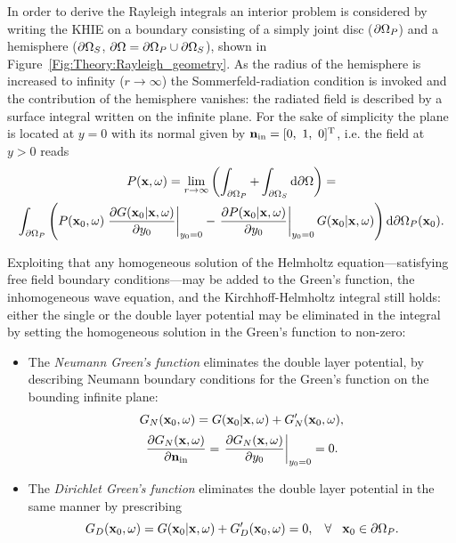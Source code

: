 

In order to derive the Rayleigh integrals an interior problem is considered by writing the KHIE on a boundary consisting of a simply joint disc ($\partial \Omega_P$) and a hemisphere ($\partial \Omega_S$, $\partial \Omega = \partial \Omega_P \cup \partial \Omega_S$), shown in Figure\ \ref{Fig:Theory:Rayleigh_geometry}. As the radius of the hemisphere is increased to infinity ($r \rightarrow \infty$) the Sommerfeld-radiation condition is invoked and the contribution of the hemisphere vanishes: the radiated field is described by a surface integral written on the infinite plane. 
For the sake of simplicity the plane is located at $y=0$ with its normal given by $\vni = [0,\ 1,\ 0]^{\mathrm{T}}$, i.e. the field at $y>0$ reads
\begin{multline}
P(\mathbf{x},\omega) = \lim_{r\rightarrow \infty} \left( \int_{\partial \Omega_P} + \int_{\partial \Omega_S} \mathrm{d} \partial \Omega \right) = \\
\int_{\partial \Omega_P}  \left( 
P(\mathbf{x}_0,\omega)  
\left. \frac{\partial G(\mathbf{x}_0|\mathbf{x},\omega)}{\partial y_0} \right|_{y_0 = 0} 
-
\left. \frac{\partial P(\mathbf{x}_0|\mathbf{x},\omega)}{\partial y_0} \right|_{y_0 = 0} 
G(\mathbf{x}_0|\mathbf{x},\omega) 
\right)   \mathrm{d} \partial \Omega_P ( \mathbf{x}_0).
\end{multline}

Exploiting that any homogeneous solution of the Helmholtz equation---satisfying free field boundary conditions---may be added to the Green's function, the inhomogeneous wave equation, and the Kirchhoff-Helmholtz integral still holds: either the single or the double layer potential may be eliminated in the integral by setting the homogeneous solution in the Green's function to non-zero:
\begin{itemize}
\item The \emph{Neumann Green's function} eliminates the double layer potential, by describing Neumann boundary conditions for the Green's function on the bounding infinite plane:
\begin{equation}
G_N(\mathbf{x}_0,\omega) = G(\mathbf{x}_0|\mathbf{x},\omega) + G'_N(\mathbf{x}_0,\omega),
\end{equation}
\begin{equation}
\frac{\partial G_N(\mathbf{x},\omega) }{\partial \mathbf{n}_{\mathrm{in}}} = \left. \frac{\partial G_N(\mathbf{x},\omega) }{\partial y_0} \right|_{y_0 = 0} = 0.
\label{Eq:Theory:Neumann_Greenfun_def}
\end{equation}
\item The \emph{Dirichlet Green's function} eliminates the double layer potential in the same manner by prescribing
\begin{equation}
G_D(\mathbf{x}_0,\omega) = G(\mathbf{x}_0|\mathbf{x},\omega) + G'_D(\mathbf{x}_0,\omega) = 0, \hspace{3mm} \forall \hspace{3mm} \mathbf{x}_0 \in \partial \Omega_P.
\label{Eq:Theory:Dirichlet_Greenfun_def}
\end{equation}
\end{itemize}

